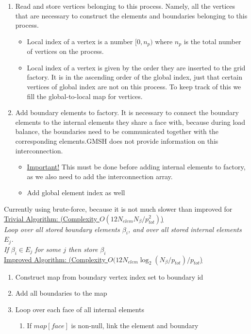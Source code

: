 \documentclass[12pt]{article}
\begin{document}
\begin{enumerate}[resume]
	\item Read and store vertices belonging to this process. Namely, all the vertices that are necessary to construct the elements and boundaries belonging to 
this process.
	\begin{itemize}
		\item Local index of a vertex is a number $[0,n_p)$ where $n_p$ is the total number of vertices on the process.
		\item Local index of a vertex is given by the order they are inserted to the grid factory. It is in the ascending order of the global index, just that certain vertices of global index are not on this process. To keep track of this we fill the global-to-local map for vertices.
	\end{itemize}

	\item Add boundary elements to factory. It is necessary to connect the boundary elements to the internal elements they share a face with, because during load balance, the boundaries need to be communicated together with the corresponding elements.GMSH does not provide information on this interconnection.
	\begin{itemize}
		\item \uline{Important!} This must be done before adding internal elements to factory, as we also need to add the interconnection array.
		\item Add global element index as well
	\end{itemize}
\end{enumerate}

\begin{mybox}
\noindent
Currently using brute-force, because it is not much slower than improved for \\

\noindent
\uline{Trivial Algorithm: (Complexity $O(12 N_{elem} N_{\beta} / p_{tot}^2)$)}\\
\textit{Loop over all stored boundary elements $\beta_i$, and over all stored internal elements $E_j$.} \\
\textit{ If $\beta_i \in E_j$ for some $j$ then store $\beta_i$ }\\

\noindent
\uline{Improved Algorithm: (Complexity $O(12 N_{elem} \log_2 (N_{\beta} / p_{tot}) / p_{tot}$)}\\

\begin{enumerate}
	\item Construct map from boundary vertex index set to boundary id
	\item Add all boundaries to the map
	\item Loop over each face of all internal elements
	\begin{enumerate}
		\item If $map[face]$ is non-null, link the element and boundary
	\end{enumerate}
\end{enumerate}

\end{mybox}	
		
\end{document}
